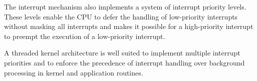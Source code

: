 The interrupt mechanism also implements a system of interrupt priority levels.
These levels enable the CPU to defer the handling of low-priority interrupts without masking all interrupts and makes it possible for a high-priority interrupt to preempt the execution of a low-priority interrupt.

A threaded kernel architecture is well suited to implement multiple interrupt priorities and to enforce the precedence of interrupt handling over background processing in kernel and application routines.



